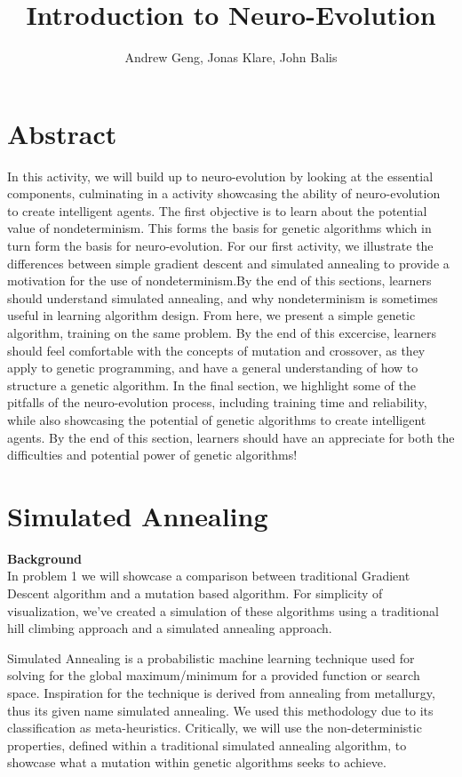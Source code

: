 \documentclass[12]{extarticle}
\begin{document}
\title{Introduction to Neuro-Evolution}
\author{Andrew Geng, Jonas Klare, John Balis}




\maketitle

\section{Abstract}
In this activity, we will build up to neuro-evolution by looking at the essential components, culminating in a activity showcasing the ability of neuro-evolution to create intelligent agents. The first objective is to learn about the potential value of nondeterminism. This forms the basis for genetic algorithms which in turn form the basis for neuro-evolution. For our first activity, we illustrate the differences between simple gradient descent and simulated annealing to provide a motivation for the use of nondeterminism.By the end of this sections, learners should understand simulated annealing, and why nondeterminism is sometimes useful in learning algorithm design. From here, we present a simple genetic algorithm, training on the same problem. By the end of this excercise, learners should feel comfortable with the concepts of mutation and crossover, as they apply to genetic programming, and have a general understanding of how to structure a genetic algorithm. In the final section, we highlight some of the pitfalls of the neuro-evolution process, including training time and reliability, while also showcasing the potential of genetic algorithms to create intelligent agents. By the end of this section, learners should have an appreciate for both the difficulties and potential power of genetic algorithms!






\section{Simulated Annealing}
\textbf{Background} \\
In problem 1 we will showcase a comparison between traditional Gradient Descent algorithm and a mutation based algorithm. For simplicity of visualization, we’ve created a simulation of these algorithms using a traditional hill climbing approach and a simulated annealing approach.

Simulated Annealing is a probabilistic machine learning technique used for solving for the global maximum/minimum for a provided function or search space. Inspiration for the technique is derived from annealing from metallurgy, thus its given name simulated annealing\cite{Nahar}. We used this methodology due to its classification as meta-heuristics. Critically, we will use the non-deterministic properties, defined within a traditional simulated annealing algorithm, to showcase what a mutation within genetic algorithms seeks to achieve.
\end{document}
